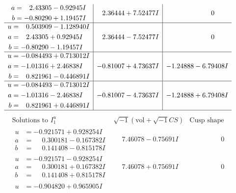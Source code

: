 \documentclass[1p]{elsarticle_modified}
\theoremstyle{definition}
\newcommand{\I}{\sqrt{-1}}
\begin{document}
$$\begin{array}{c|c|c}
\begin{aligned}
a &= \phantom{-}2.43305 - 0.92945 I \\
b &= -0.80290 + 1.19457 I\end{aligned}
 & \phantom{-}2.36444 + 7.52477 I & \phantom{-0.000000 } 0 \\ \hline\begin{aligned}
u &= \phantom{-}0.503909 - 1.128940 I \\
a &= \phantom{-}2.43305 + 0.92945 I \\
b &= -0.80290 - 1.19457 I\end{aligned}
 & \phantom{-}2.36444 - 7.52477 I & \phantom{-0.000000 } 0 \\ \hline\begin{aligned}
u &= -0.084493 + 0.713012 I \\
a &= -1.01316 + 2.46838 I \\
b &= \phantom{-}0.821961 - 0.446891 I\end{aligned}
 & -0.81007 + 4.73637 I & -1.24888 - 6.79408 I \\ \hline\begin{aligned}
u &= -0.084493 - 0.713012 I \\
a &= -1.01316 - 2.46838 I \\
b &= \phantom{-}0.821961 + 0.446891 I\end{aligned}
 & -0.81007 - 4.73637 I & -1.24888 + 6.79408 I\\
 \hline 
 \end{array}$$\newpage$$\begin{array}{c|c|c}  
\text{Solutions to }I^u_{1}& \I (\text{vol} + \sqrt{-1}CS) & \text{Cusp shape}\\
 \hline 
\begin{aligned}
u &= -0.921571 + 0.928254 I \\
a &= \phantom{-}0.300181 - 0.167382 I \\
b &= \phantom{-}0.141408 - 0.815178 I\end{aligned}
 & \phantom{-}7.46078 - 0.75691 I & \phantom{-0.000000 } 0 \\ \hline\begin{aligned}
u &= -0.921571 - 0.928254 I \\
a &= \phantom{-}0.300181 + 0.167382 I \\
b &= \phantom{-}0.141408 + 0.815178 I\end{aligned}
 & \phantom{-}7.46078 + 0.75691 I & \phantom{-0.000000 } 0 \\ \hline\begin{aligned}
u &= -0.904820 + 0.965905 I \\

\end{aligned}
\end{array}$$
\end{document}

